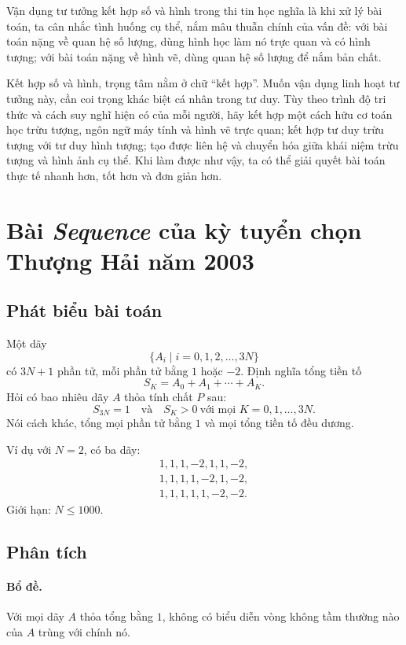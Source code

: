 \documentclass[11pt]{article}
\begin{document}
Vận dụng tư tưởng kết hợp số và hình trong thi tin học nghĩa là khi xử lý bài
toán, ta cân nhắc tình huống cụ thể, nắm mâu thuẫn chính của vấn đề: với bài
toán nặng về quan hệ số lượng, dùng hình học làm nó trực quan và có hình
tượng; với bài toán nặng về hình vẽ, dùng quan hệ số lượng để nắm bản chất.

Kết hợp số và hình, trọng tâm nằm ở chữ ``kết hợp''. Muốn vận dụng linh hoạt
tư tưởng này, cần coi trọng khác biệt cá nhân trong tư duy. Tùy theo trình độ
tri thức và cách suy nghĩ hiện có của mỗi người, hãy kết hợp một cách hữu cơ
toán học trừu tượng, ngôn ngữ máy tính và hình vẽ trực quan; kết hợp tư duy
trừu tượng với tư duy hình tượng; tạo được liên hệ và chuyển hóa giữa khái
niệm trừu tượng và hình ảnh cụ thể. Khi làm được như vậy, ta có thể giải
quyết bài toán thực tế nhanh hơn, tốt hơn và đơn giản hơn.

\appendix
\section{Bài \textit{Sequence} của kỳ tuyển chọn Thượng Hải năm 2003}

\subsection*{Phát biểu bài toán}

Một dãy
\[
  \{A_i\mid i=0,1,2,\ldots,3N\}
\]
có $3N+1$ phần tử, mỗi phần tử bằng $1$ hoặc $-2$. Định nghĩa tổng tiền tố
\[
  S_K=A_0+A_1+\cdots+A_K.
\]
Hỏi có bao nhiêu dãy $A$ thỏa tính chất $P$ sau:
\[
  S_{3N}=1
  \quad\text{và}\quad
  S_K>0\ \text{với mọi }K=0,1,\ldots,3N.
\]
Nói cách khác, tổng mọi phần tử bằng $1$ và mọi tổng tiền tố đều dương.

Ví dụ với $N=2$, có ba dãy:
\[
\begin{array}{l}
1,1,1,-2,1,1,-2,\\
1,1,1,1,-2,1,-2,\\
1,1,1,1,1,-2,-2.
\end{array}
\]
Giới hạn: $N\le 1000$.

\subsection*{Phân tích}

\paragraph{Bổ đề.}
Với mọi dãy $A$ thỏa tổng bằng $1$, không có biểu diễn vòng không tầm thường
nào của $A$ trùng với chính nó.
\end{document}
